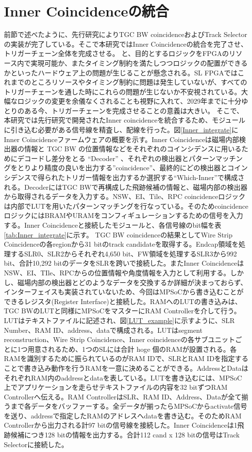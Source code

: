 \section{Inner Coincidenceの統合}
前節で述べたように、先行研究によりTGC BW coincidenceおよびTrack Selectorの実装が完了している。そこで本研究ではInner Coincidenceの統合を完了させ、トリガーチェーン全体を完成させる。
と、目的とするロジックをFPGAのリソース内で実現可能か、またタイミング制約を満たしつつロジックの配置ができるかといったハードウェア上の問題が生じることが懸念される。SL FPGAではこれまでのところリソースやタイミング制約に問題は発生していないが、すべてのトリガーチェーンを通した時にこれらの問題が生じないか不安視されている。大幅なロジックの変更を余儀なくされることも視野に入れて、2029年までに十分ゆとりのある今、トリガーチェーンを完成させることの意義は大きい。
そこで、本研究では先行研究で開発されたInner coincidenceを統合するため、モジュールに引き込む必要がある信号線を精査し、配線を行った。図\ref{Inner_integrate}にInner Coincidenceファームウェアの概要を示す。Inner Coincidenceは磁場内部検出器の情報と TGC BW の位置情報などをそれぞれのコインシデンスに用いるためにデコードし差分をとる “Decoder” 、それぞれの検出器とパターンマッチングをとりより精度の良い\pt を出力する”coincidence”、最終的にどの検出器とコインシデンスで得られたトリガー情報を出力するか選択する“Which-Inner”で構成される。DecoderにはTGC BWで再構成した飛跡候補の情報と、磁場内部の検出器から取得されるデータを入力する。NSW、EI、Tile、RPC coincidenceロジックは内部でLUTを用いたパターンマッチングを行なっている。そのためcoincidenceロジックにはBRAMやURAMをコンフィギュレーションするための信号を入力する。Inner Coincidenceと接続したモジュールと、各信号線のbit幅を表\ref{tab:Inner_integrate}に示す。
TGC BW coincidenceの結果としてWire Strip Coincidenceの各regionから31 bitのtrack candidateを取得する。Endcap領域を処理するSLR0、SLR2からそれぞれ4,650 bit、FW領域を処理するSLR3から992 bit、合計10,292 bitのデータをSLRを跨いで接続した。またInner CoincidenceはNSW、EI、TIle、RPCからの位置情報や角度情報を入力として利用する。しかし、磁場内部の検出器とどのようなデータを交換するか詳細が決まっておらず、インターフェイスも実装されていないため、今回はMPSoCから書き込むことができるレジスタ(Register Interface)と接続した。RAMへのLUTの書き込みは、TGC BWのLUTと同様にMPSoCをマスターにRAM Controllerを介して行う。LUTはテキストファイルに記述され、図\ref{LUT_example}に示すように、SLR Number、RAM ID、address、dataで構成される。LUTはsegment reconstruction、Wire Strip Coincidence、Inner coincidenceの各サブユニットごとに1つ用意されるため、1つのSLには合計 hoge 個のRAMが設置される。各RAMを識別するために振られているのがRAM IDで、SLRとRAM IDを指定することで書き込み動作を行うRAMを一意に決めることができる。AddressとDataはそれぞれRAM内のaddressとdataを表している。LUTを書き込むには、MPSoC上でアプリケーションを走らせテキストファイルの内容を32 bitずつRAM Controllerへ伝える。RAM ControllerはSLR、RAM ID、Address、Dataが全て揃うまで各データをバッファーする。全データが揃ったらMPSoCからactivate信号を送り、addressで指定したRAMのアドレスへdataを書き込む。そのためRAM Controllerから出力される計97 bitの信号線を接続した。Inner Coincidenceは1飛跡候補につき128 bitの情報を出力する。合計112 cand x 128 bitの信号はTrack Selectorに接続した。

